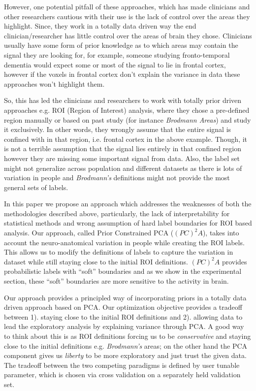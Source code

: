 \documentclass{llncs}
\begin{document}
However, one potential pitfall of these approaches, which has made clinicians and other researchers cautious with their use is the lack of control over the areas they highlight. Since, they work in a totally data driven way the end clinician/researcher has little control over the areas of brain they chose. Clinicians usually have some form of prior knowledge as to which areas may contain the signal they are looking for, for example, someone studying fronto-temporal dementia would expect some or most of the signal to lie in frontal cortex, however if the voxels in frontal cortex don't explain the variance in data these approaches won't highlight them. 

So, this has led the clinicians and researchers to work with totally prior driven approaches e.g. ROI (Region of Interest) analysis, where they chose a pre-defined region manually or based on past study (for instance {\em Brodmann Areas}) and study it exclusively. In other words, they wrongly assume that the entire signal is confined with in that region, i.e. frontal cortex in the above example. Though, it is not a terrible assumption that the signal lies entirely in that confined region however they are missing some important signal from data. Also, the label set might not generalize across population and different datasets as there is lots of variation in people and {\it Brodmann's} definitions might not provide the most general sets of labels.

In this paper we propose an approach which addresses the weaknesses of both the methodologies described above, particularly, the lack of interpretability for statistical methods and wrong assumption of hard label boundaries for ROI based analysis. Our approach, called Prior Constrained PCA ($(PC)^2A$),  takes into account the neuro-anatomical variation in people while creating the ROI labels. This allows us to modify the definitions of labels to capture the variation in dataset while still staying close to the initial ROI definitions. $(PC)^2A$ provides probabilistic labels with ``soft'' boundaries and as we show in the experimental section, these ``soft'' boundaries are more sensitive to the activity in brain.

Our approach provides a principled way of incorporating priors in a totally data driven approach based on PCA. Our optimization objective provides a tradeoff between 1). staying close to the initial ROI definitions and 2). allowing data to lead the exploratory analysis by explaining variance through PCA. A good way to think about this is as ROI definitions forcing us to be {\em conservative} and staying close to the initial definitions e.g. {\it Brodmann's} areas; on the other hand the PCA component gives us {\em liberty} to be more exploratory and just trust the given data. The tradeoff between the two competing paradigms is defined by user tunable parameter, which is chosen via cross validation on a separately held validation set. 
\end{document}
